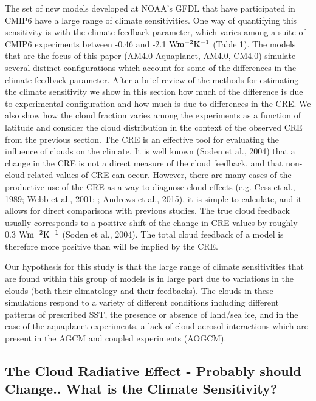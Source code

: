 \documentclass[draft]{agujournal2019}
\begin{document}
The set of new models developed at NOAA's GFDL that have participated in CMIP6 have a large range of climate sensitivities.  
One way of quantifying this sensitivity is with the climate feedback parameter, which 
varies among a suite of CMIP6 experiments between -0.46 and -2.1 $\rm{W m^{-2}K^{-1}}$ (Table 1).  
The models that are the focus of this paper (AM4.0 Aquaplanet, AM4.0, CM4.0) simulate several 
distinct configurations which account for some of the differences in the climate feedback parameter.  
After a brief review of the methods for estimating the climate sensitivity we show in this section how much of the difference is 
due to experimental configuration and how much is due to differences in the CRE.  
We also show how the cloud fraction varies among
the experiments as a function of latitude and consider the cloud distribution in the context of the observed
CRE from the previous section.  The CRE is an effective tool for evaluating the influence of 
clouds on the climate.  It is well known (Soden et al., 2004) that a change in the CRE is not a direct measure of the cloud 
feedback, and that non-cloud related values of CRE can occur.  However, there are many cases of 
the productive use of the CRE as a way to diagnose cloud effects (e.g. Cess et al., 1989; Webb et al., 2001; 
; Andrews et al., 2015), it is simple to calculate, and
it allows for direct comparisons with previous studies.  The true cloud feedback usually corresponds 
to a positive shift of the change in CRE values by roughly 0.3 $\rm{W m^{-2}K^{-1}}$ (Soden et al., 2004).  The total cloud feedback of a model 
is therefore more positive than will be implied by the CRE.       

Our hypothesis for this study is that the large range of climate sensitivities that are found within this 
group of models is in large part due to variations in the clouds (both their climatology and their feedbacks).
The clouds in these simulations respond to a variety of different conditions including different
patterns of prescribed SST, the presence or absence of land/sea ice, and in the case of the aquaplanet
experiments, a lack of cloud-aerosol interactions which are present in the AGCM and coupled 
experiments (AOGCM).  

\subsection{The Cloud Radiative Effect - Probably should Change.. What is the Climate Sensitivity?} 
\end{document}
